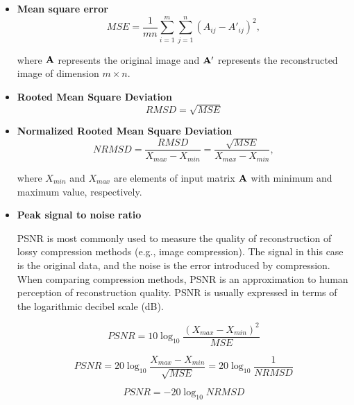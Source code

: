 \begin{itemize}
\item \textbf{Mean square error}
\begin{equation}
MSE=\frac{1}{m n} \sum_{i=1}^{m} \sum_{j=1}^{n} (A_{ij} - A'_{ij})^{2},
\label{eq:mse-def}
\end{equation}

where $\mathbf{A}$ represents the original image and $\mathbf{A'}$ represents the
reconstructed image of dimension $m \times n$.

\item \textbf{Rooted Mean Square Deviation}
\begin{equation}
RMSD=\sqrt{MSE}
\label{eq:rmsd-def}
\end{equation}

\item \textbf{Normalized Rooted Mean Square Deviation}
\begin{equation}
NRMSD=\frac{RMSD}{X_{max}-X_{min}}=\frac{\sqrt{MSE}}{X_{max}-X_{min}},
\label{eq:nrmsd-def}
\end{equation}

where $X_{min}$ and $X_{max}$ are elements of input matrix $\mathbf{A}$ with minimum and maximum value, respectively.

\item \textbf{Peak signal to noise ratio}

PSNR is most commonly used to measure the quality of reconstruction of lossy compression methods (e.g., image compression). The signal in this case is the original data, and the noise is the error introduced by compression. When comparing compression methods, PSNR is an approximation to human perception of reconstruction quality. PSNR is usually expressed in terms of the logarithmic decibel scale (dB).

\begin{equation}
PSNR=10\log_{10}\frac{(X_{max}-X_{min})^{2}}{MSE}
\end{equation}

\begin{equation}
PSNR=20\log_{10}\frac{X_{max}-X_{min}}{\sqrt{MSE}}=20\log_{10}\frac{1}{NRMSD}
\end{equation}

\begin{equation}
PSNR=-20\log_{10}NRMSD
\label{eq:psnr-def}
\end{equation}

\end{itemize}

